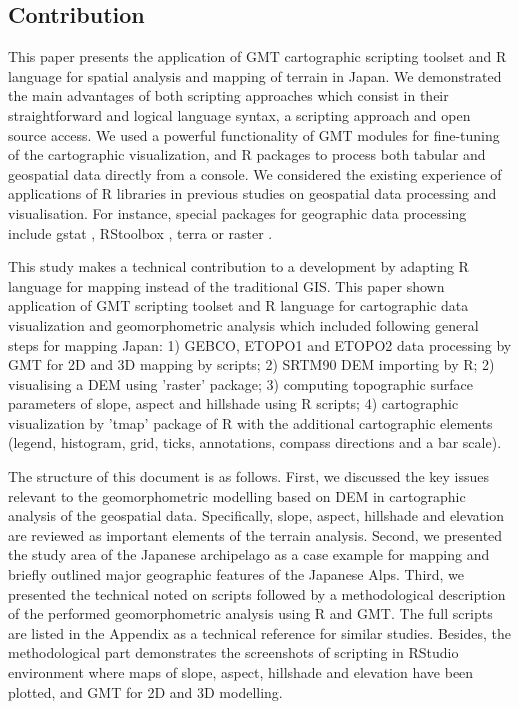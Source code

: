 \documentclass[land,article,submit,pdftex,moreauthors]{Definitions/mdpi}
\begin{document}
\subsection{Contribution}

This paper presents the application of GMT cartographic scripting toolset \cite{Wesseletal2019} and R language \cite{RCoreTeam} for spatial analysis and mapping of terrain in Japan. We demonstrated the main advantages of both scripting approaches which consist in their straightforward and logical language syntax, a scripting approach and open source access. We used a powerful functionality of GMT modules for fine-tuning of the cartographic visualization, and R packages to process both tabular and geospatial data directly from a console. We considered the existing experience of applications of R libraries in previous studies on geospatial data processing and visualisation. For instance, special packages for geographic data processing include gstat \cite{HENGL20081886}, RStoolbox \cite{app122412554}, terra or raster \cite{jimaging8120317}.

This study makes a technical contribution to a development by adapting R language for mapping instead of the traditional GIS. This paper shown application of GMT scripting toolset and R language for cartographic data visualization and geomorphometric analysis which included following general steps for mapping Japan: 1) GEBCO, ETOPO1 and ETOPO2 data processing by GMT for 2D and 3D mapping by scripts; 2) SRTM90 DEM importing by R; 2) visualising a DEM using 'raster' package; 3) computing topographic surface parameters of slope, aspect and hillshade using R scripts; 4) cartographic visualization by 'tmap' package of R with the additional cartographic elements (legend, histogram, grid, ticks, annotations, compass directions and a bar scale). 

The structure of this document is as follows. First, we discussed the key issues relevant to the geomorphometric modelling based on DEM in cartographic analysis of the geospatial data. Specifically, slope, aspect, hillshade and elevation are reviewed as important elements of the terrain analysis. Second, we presented the study area of the Japanese archipelago as a case example for mapping and briefly outlined major geographic features of the Japanese Alps. Third, we presented the technical noted on scripts followed by a methodological description of the performed geomorphometric analysis using R and GMT. The full scripts are listed in the Appendix as a technical reference for similar studies. Besides, the methodological part demonstrates the screenshots of scripting in RStudio environment where maps of slope, aspect, hillshade and elevation have been plotted, and GMT for 2D and 3D modelling. 
\end{document}
